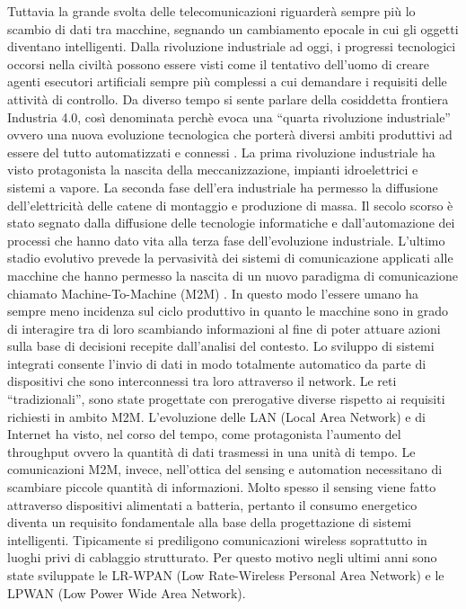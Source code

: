 \documentclass[12pt,a4paper,openright,twoside]{report}
\begin{document}
Tuttavia la grande svolta delle telecomunicazioni riguarder\`a sempre pi\`u lo scambio di dati tra macchine, segnando un cambiamento epocale in cui gli oggetti diventano intelligenti.  
Dalla rivoluzione industriale ad oggi, i progressi tecnologici occorsi nella civilt\`a possono essere visti come il tentativo dell'uomo di creare agenti esecutori artificiali sempre pi\`u complessi a cui demandare i requisiti delle attivit\`a di controllo. Da diverso tempo si sente parlare della cosiddetta frontiera Industria 4.0, cos\`i denominata perch\`e evoca una ``quarta rivoluzione industriale''  ovvero una nuova evoluzione tecnologica che porter\`a diversi ambiti produttivi ad essere del tutto automatizzati e connessi \cite{K25}.
La prima rivoluzione industriale ha visto protagonista la nascita della meccanizzazione, impianti idroelettrici e sistemi a vapore. La seconda fase dell'era industriale ha permesso la diffusione dell'elettricit\`a delle catene di montaggio e produzione di massa. Il secolo scorso \`e stato segnato dalla diffusione delle tecnologie informatiche e dall'automazione dei processi che hanno dato vita alla terza fase dell'evoluzione industriale. L'ultimo stadio evolutivo prevede la pervasivit\`a dei sistemi di comunicazione applicati alle macchine che hanno permesso la nascita di un nuovo paradigma di comunicazione chiamato Machine-To-Machine (M2M) \cite{K26}. In questo modo l'essere umano ha sempre meno incidenza sul ciclo produttivo in quanto le macchine sono in grado di interagire tra di loro scambiando informazioni al fine di poter attuare azioni sulla base di decisioni recepite dall'analisi del contesto. Lo sviluppo di sistemi integrati consente l'invio di dati in modo totalmente automatico da parte di dispositivi che sono interconnessi tra loro attraverso il network.
Le reti ``tradizionali'', sono state progettate con prerogative diverse rispetto ai requisiti richiesti in ambito M2M. 
L'evoluzione delle LAN (Local Area Network) e di Internet ha visto, nel corso del tempo, come protagonista l'aumento del throughput ovvero la quantit\`a di dati trasmessi in una unit\`a di tempo. 
Le comunicazioni M2M, invece, nell'ottica del sensing e automation necessitano di scambiare piccole quantit\`a di informazioni. Molto spesso il sensing viene fatto attraverso dispositivi alimentati a batteria, pertanto il consumo energetico diventa un requisito fondamentale alla base della progettazione di sistemi intelligenti.
Tipicamente si prediligono comunicazioni wireless soprattutto in luoghi privi di cablaggio strutturato.    Per questo motivo negli ultimi anni sono state sviluppate le LR-WPAN (Low Rate-Wireless Personal Area Network) e le LPWAN (Low Power Wide Area Network).  
\end{document}
